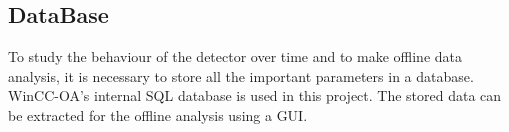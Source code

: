 \subsection{DataBase}
To study the behaviour of the detector over time and to make offline data analysis, it is necessary to store all the important parameters in a database. WinCC-OA's internal SQL database is used in this project. The stored data can be extracted for the offline analysis using a GUI.


